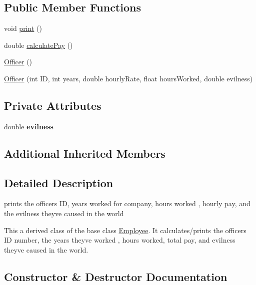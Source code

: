 \subsection*{Public Member Functions}
\begin{DoxyCompactItemize}
\item 
void \hyperlink{classOfficer_aeadece05a1a0b7fb29bd412830d2e07a}{print} ()
\item 
double \hyperlink{classOfficer_a1fa1aad39b9e95be7a088990ebf17059}{calculate\+Pay} ()
\item 
\hyperlink{classOfficer_a80ac1e36a3f36c3a7e12b5dc9320ad89}{Officer} ()
\item 
\hyperlink{classOfficer_ac75c45d6e8628606278cb4ce6596f67f}{Officer} (int ID, int years, double hourly\+Rate, float hours\+Worked, double evilness)
\end{DoxyCompactItemize}
\subsection*{Private Attributes}
\begin{DoxyCompactItemize}
\item 
\mbox{\label{classOfficer_a63465c5f16e8148e5bc0a3bb4ecd1781}} 
double {\bfseries evilness}
\end{DoxyCompactItemize}
\subsection*{Additional Inherited Members}


\subsection{Detailed Description}
prints the officer\textquotesingle{}s ID, years worked for company, hours worked , hourly pay, and the evilness they\textquotesingle{}ve caused in the world 

This a derived class of the base class \hyperlink{classEmployee}{Employee}. It calculates/prints the officer\textquotesingle{}s ID number, the years they\textquotesingle{}ve worked , hours worked, total pay, and evilness they\textquotesingle{}ve caused in the world. 

\subsection{Constructor \& Destructor Documentation}
\mbox{\label{classOfficer_a80ac1e36a3f36c3a7e12b5dc9320ad89}} 

